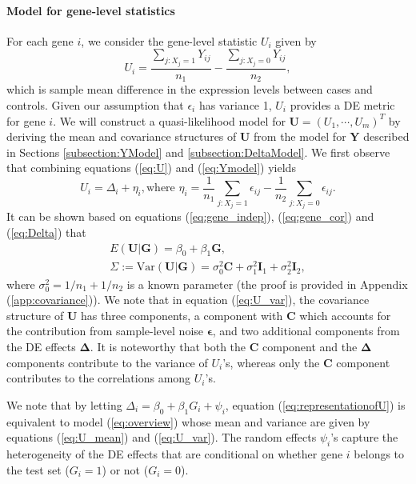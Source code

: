 	\paragraph{Model for gene-level statistics}\label{subsection:UModel}
	For each gene $i$, we consider the gene-level statistic $U_i$ given by 
	\begin{equation}
	\label{eq:U}
	U_i = \dfrac{\sum_{j: X_j=1}Y_{ij}}{n_1} - \dfrac{\sum_{j: X_j=0}Y_{ij}}{n_2},
	\end{equation}
	which is sample mean difference in the expression levels between cases and controls. Given our
	assumption that $\epsilon_i$ has variance 1, $U_i$ provides a DE metric for gene $i$. We will
	construct a quasi-likelihood model for $\bm U=(U_1,\cdots,U_m)^T$ by deriving the mean and
	covariance structures of $\bm U$ from the model for $\bm Y$ described in Sections
	\ref{subsection:YModel} and \ref{subsection:DeltaModel}. We first observe that combining 
	equations (\ref{eq:U}) and (\ref{eq:Ymodel}) yields
	\begin{equation}\label{eq:representationofU}
	U_i = \Delta_i + \eta_i, \text{where } \eta_i = \dfrac{1}{n_1}\sum_{j: X_j=1}\epsilon_{ij}-
	\dfrac{1}{n_2}\sum_{j: X_j=0}\epsilon_{ij}.
	\end{equation}
	It can be shown based on equations (\ref{eq:gene_indep}), (\ref{eq:gene_cor}) and 
	(\ref{eq:Delta}) that
	\begin{gather}
	E(\bm U|\bm G) = \beta_0+\beta_1 \bm G,\label{eq:U_mean}\\
	\Sigma:=\mbox{Var}(\bm U|\bm G) = \sigma_0^2\bm C + \sigma_1^2\bm I_1+\sigma_2^2\bm
	I_2,\label{eq:U_var}
	\end{gather}
	where $\sigma_0^2=1/n_1+1/n_2$ is a known parameter (the proof is provided in Appendix 
	(\ref{app:covariance})). We note that in equation (\ref{eq:U_var}), the	covariance structure of 
	$\bm U$ has three components, a component with $\bm C$ which accounts for the contribution from 
	sample-level noise $\bm \epsilon$, and two additional components from the DE effects $\bm 
	\Delta$. It is noteworthy that both the $\bm C$ component and the $\bm \Delta$ components 
	contribute to the variance of $U_i$'s, whereas only the $\bm C$ component contributes to
	the correlations among $U_i$'s.
	
	We note that by letting $\Delta_i = \beta_0 + \beta_1 G_i + \psi_i$, equation 
	(\ref{eq:representationofU}) is equivalent to model (\ref{eq:overview}) whose mean 
	and variance are given by equations (\ref{eq:U_mean}) and (\ref{eq:U_var}). The random effects 
	$\psi_i$'s capture the heterogeneity of the DE effects that are conditional on whether gene $i$ 
	belongs to the test set ($G_i=1$) or not ($G_i= 0$).
	
